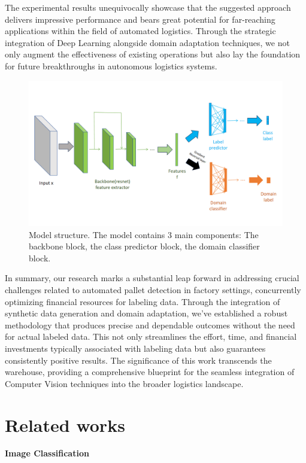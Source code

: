 \documentclass[sigconf,authordraft]{acmart}
\begin{document}
\noindent The experimental results unequivocally showcase that the suggested approach delivers impressive performance and bears great potential for far-reaching applications within the field of automated logistics. Through the strategic integration of Deep Learning alongside domain adaptation techniques, we not only augment the effectiveness of existing operations but also lay the foundation for future breakthroughs in autonomous logistics systems.
\begin{figure}
  \centering
  \includegraphics[width=1\textwidth]{images/model.png}
  \caption{Model structure. The model contains 3 main components: The backbone block, the class predictor block, the domain classifier block.}
  \label{fig:your-image}
\end{figure}
\noindent In summary, our research marks a substantial leap forward in addressing crucial challenges related to automated pallet detection in factory settings, concurrently optimizing financial resources for labeling data. Through the integration of synthetic data generation and domain adaptation, we've established a robust methodology that produces precise and dependable outcomes without the need for actual labeled data. This not only streamlines the effort, time, and financial investments typically associated with labeling data but also guarantees consistently positive results. The significance of this work transcends the warehouse, providing a comprehensive blueprint for the seamless integration of Computer Vision techniques into the broader logistics landscape.

\section{Related works}
\noindent\textbf{Image Classification}
\end{document}
